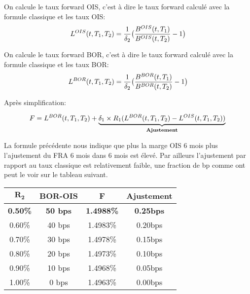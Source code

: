 \documentclass{article}
\begin{document}
On calcule le taux forward OIS, c'est à dire le taux forward calculé avec la formule classique et les taux OIS:\\

\[
L^{OIS}(t,T_1,T_2)=\frac{1}{\delta_2}\big(\frac{B^{OIS}(t,T_1)}{B^{OIS}(t,T_2)}-1\big)\\
\]

On calcule le taux forward BOR, c'est à dire le taux forward calculé avec la formule classique et les taux BOR:\\

\[
L^{BOR}(t,T_1,T_2)=\frac{1}{\delta_2}\big(\frac{B^{BOR}(t,T_1)}{B^{BOR}(t,T_2)}-1\big)\\
\]

Après simplification:

\[
F=L^{BOR}(t,T_1,T_2)+\underbrace{\delta_1 \times R_1 (L^{BOR}(t,T_1,T_2)-L^{OIS}(t,T_1,T_2))}_{\textbf{Ajustement}} \\
\]

La formule précédente nous indique que plus la marge OIS 6 mois plus l'ajustement du FRA 6 mois dans 6 mois est élevé. Par ailleurs l'ajustement par rapport au taux classique est relativement faible, une fraction de bp comme ont peut le voir sur le tableau suivant.

\begin{center}
\begin{tabular}{|c|c|c|c|}  
\hline  
$\boldsymbol{R_2}$ & \textbf{BOR-OIS} & \textbf{F} & \textbf{Ajustement} \\ 
\hline  
\textbf{\color{red}0.50\%} & \textbf{\color{red}50 bps} & \textbf{\color{red}1.4988\%} & \textbf{\color{red}0.25bps}\\ 
0.60\% & 40 bps & 1.4983\% & 0.20bps\\ 
0.70\% & 30 bps & 1.4978\% & 0.15bps\\ 
0.80\% & 20 bps & 1.4973\% & 0.10bps\\ 
0.90\% & 10 bps & 1.4968\% & 0.05bps\\ 
1.00\% & 0 bps & 1.4963\% & 0.00bps\\ 
\hline  
\end{tabular}
\end{center}
\end{document}
